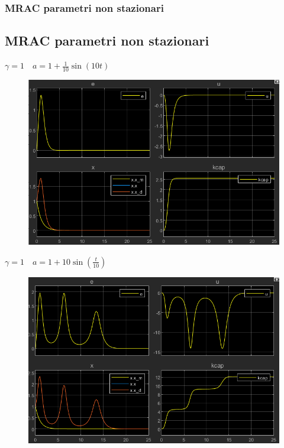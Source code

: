 \documentclass{beamer}
\begin{document}
\begin{frame}
	\frametitle{MRAC parametri non stazionari}
	\subsection{MRAC parametri non stazionari}
	\begin{minipage}[t]{0.45\textwidth}
		\textbf{\(\gamma=1\quad a=1+\frac{1}{10}\sin{(10t)}\)}
		\begin{figure}
			\includegraphics[scale=0.25]{2022-05-20-12-52-05.png} %
		\end{figure}
	\end{minipage}
	\begin{minipage}[t]{0.45\textwidth}
		\textbf{\(\gamma=1\quad a=1+10\sin{(\frac{t}{10})}\)}
		\begin{figure}
			\includegraphics[scale=0.25]{2022-05-20-12-55-10.png} %
		\end{figure}
	\end{minipage}
\end{frame}
\end{document}
